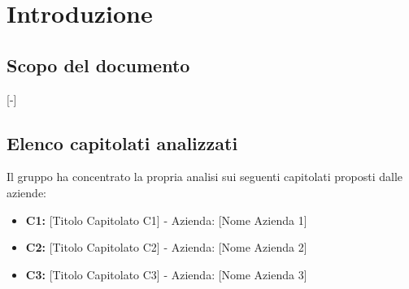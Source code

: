 \section{Introduzione}

\subsection{Scopo del documento}
[-]

\subsection{Elenco capitolati analizzati}
Il gruppo ha concentrato la propria analisi sui seguenti capitolati proposti dalle aziende:
\begin{itemize}
	\item \textbf{C1:} {[Titolo Capitolato C1]} - Azienda: {[Nome Azienda 1]}
	\item \textbf{C2:} {[Titolo Capitolato C2]} - Azienda: {[Nome Azienda 2]}
	\item \textbf{C3:} {[Titolo Capitolato C3]} - Azienda: {[Nome Azienda 3]}
\end{itemize}